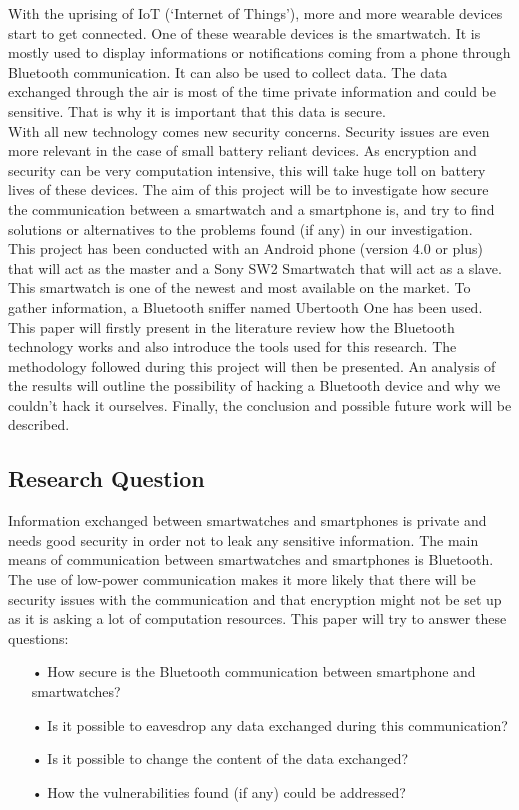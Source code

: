 
With the uprising of IoT (‘Internet of Things’), more and more wearable devices start to get connected. One of these wearable devices is the smartwatch. It is mostly used to display informations or notifications coming from a phone through Bluetooth communication. It can also be used to collect data. The data exchanged through the air is most of the time private information and could be sensitive. That is why it is important that this data is secure.\\

With all new technology comes new security concerns. Security issues are even more relevant in the case of small battery reliant devices. As encryption and security can be very computation intensive, this will take huge toll on battery lives of these devices. The aim of this project will be to investigate how secure the communication between a smartwatch and a smartphone is, and try to find solutions or alternatives to the problems found (if any) in our investigation.\\

This project has been conducted with an Android phone (version 4.0 or plus) that will act as the master and a Sony SW2 Smartwatch that will act as a slave. This smartwatch is one of the newest and most available on the market. To gather information, a Bluetooth sniffer named Ubertooth One has been used.\\

This paper will firstly present in the literature review  how the Bluetooth technology works and also introduce the tools used for this research. The methodology followed during this project will then be presented. An analysis of the results will outline the possibility of hacking a Bluetooth device and why we couldn't hack it ourselves. Finally, the conclusion and possible future work will be described.
\newpage
\subsection{Research Question}
Information exchanged between smartwatches and smartphones is private and needs good security in order not to leak any sensitive information. 
The main means of communication between smartwatches and smartphones is Bluetooth.
The use of low-power communication makes it more likely that there will be security issues with the communication and that encryption might not be set up as it is asking a lot of computation resources. 
This paper will try to answer these questions:
\begin{itemize}
\item[•] How secure is the Bluetooth communication between smartphone and smartwatches?
\item[•]Is it possible to eavesdrop any data exchanged during this communication?
\item[•]Is it possible to change the content of the data exchanged?
\item[•]How the vulnerabilities found (if any) could be addressed?
\end{itemize}

